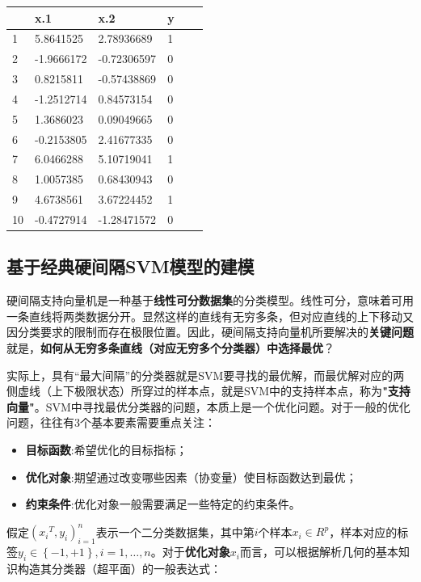 \documentclass[12pt]{article}  %
\begin{document}
\begin{longtable}[]{@{}llllll@{}}
	\toprule\noalign{}
	 & x.1 & x.2 & y \\
	\midrule\noalign{}
	\endhead
	\bottomrule\noalign{}
	\endlastfoot
	
	1 & 5.8641525 & 2.78936689 & 1 \\
	2 & -1.9666172 & -0.72306597 & 0 \\
	3 & 0.8215811 & -0.57438869 & 0 \\
	4 & -1.2512714 & 0.84573154 & 0 \\
	5 & 1.3686023 & 0.09049665 & 0 \\
	6 & -0.2153805 & 2.41677335 & 0 \\
	7 & 6.0466288 & 5.10719041 & 1 \\
	8 & 1.0057385 & 0.68430943 & 0 \\
	9 & 4.6738561 & 3.67224452 & 1 \\
	10 & -0.4727914 & -1.28471572 & 0 \\
\end{longtable}

\subsection{基于经典硬间隔SVM模型的建模}

硬间隔支持向量机是一种基于\textbf{线性可分数据集}的分类模型。线性可分，意味着可用一条直线将两类数据分开。显然这样的直线有无穷多条，但对应直线的上下移动又因分类要求的限制而存在极限位置。因此，硬间隔支持向量机所要解决的\textbf{关键问题}就是，\textbf{如何从无穷多条直线（对应无穷多个分类器）中选择最优}？

实际上，具有“最大间隔”的分类器就是SVM要寻找的最优解，而最优解对应的两侧虚线（上下极限状态）所穿过的样本点，就是SVM中的支持样本点，称为\textbf{"支持向量"}。SVM中寻找最优分类器的问题，本质上是一个优化问题。对于一般的优化问题，往往有3个基本要素需要重点关注：

\begin{itemize}
	\setlength{\parsep}{0ex} %
	\setlength{\topsep}{2ex} %
	\setlength{\itemsep}{1ex} %
	\item \textbf{目标函数}:希望优化的目标指标；		
	\item \textbf{优化对象}:期望通过改变哪些因素（协变量）使目标函数达到最优；
	\item \textbf{约束条件}:优化对象一般需要满足一些特定的约束条件。
\end{itemize}

假定${{({x_i}^T,y_i)}}_{i=1}^n$表示一个二分类数据集，其中第$i$个样本$x_i\in R^p$，样本对应的标签$y_i\in\left\{-1,+1\right\},i=1,\ldots,n$。对于\textbf{优化对象$x_i$}而言，可以根据解析几何的基本知识构造其分类器（超平面）的一般表达式：
\end{document}
